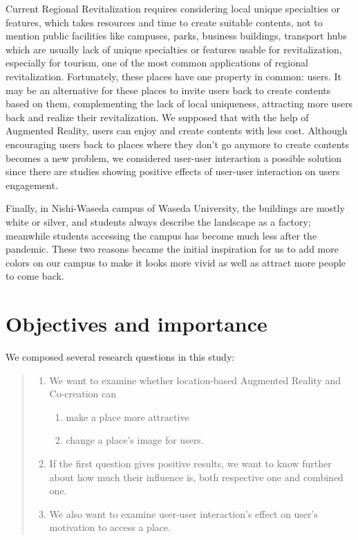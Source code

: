 Current Regional Revitalization requires considering local unique specialties or features, which takes resources and time to create suitable contents,
not to mention public facilities like campuses, parks, business buildings, transport hubs which are usually lack of unique specialties or features usable for revitalization,
especially for tourism, one of the most common applications of regional revitalization.
Fortunately, these places have one property in common: users. It may be an alternative for these places to invite users back to create contents based on them,
complementing the lack of local uniqueness, attracting more users back and realize their revitalization.
We supposed that with the help of Augmented Reality, users can enjoy and create contents with less cost.
Although encouraging users back to places where they don't go anymore to create contents becomes a new problem,
we considered user-user interaction a possible solution since there are studies showing positive effects of user-user interaction on users engagement.


Finally, in Nishi-Waseda campus of Waseda University, the buildings are mostly white or silver, and students always describe the landscape as a factory; meanwhile students accessing the campus has become much less after the pandemic.
These two reasons became the initial inspiration for us to add more colors on our campus to make it looks more vivid as well as attract more people to come back.

\section{Objectives and importance}


We composed several research questions in this study:
\begin{quote}
  \begin{enumerate}
    \item We want to examine whether location-based Augmented Reality and Co-creation can
      \begin{enumerate}
        \item make a place more attractive
        \item change a place's image for users.
      \end{enumerate}
    \item If the first question gives positive results, we want to know further about how much their influence is, both respective one and combined one.
    \item We also want to examine user-user interaction's effect on user's motivation to access a place.
  \end{enumerate}
\end{quote}

